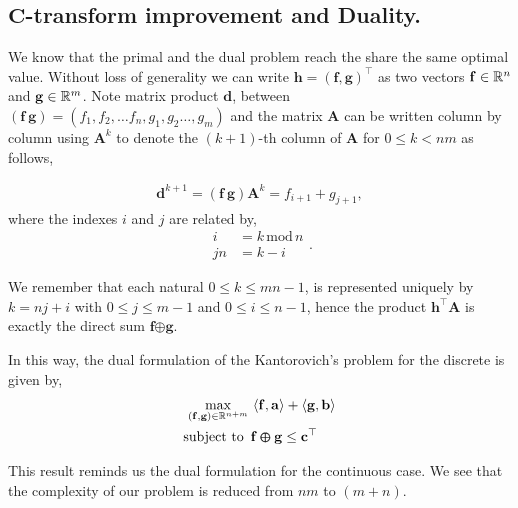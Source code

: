 \subsection{$\mathbf{C}$-transform improvement and Duality.}
We know that the primal and the dual problem reach the share the same optimal value. Without loss of generality we can write $\mathbf{h}=(\mathbf{f}, \mathbf{g})^\top$ as two vectors $\mathbf{f}\in \mathbb{R}^n$ and $\mathbf{g}\in \mathbb{R}^m$. Note matrix product $\mathbf{d}$, between
$(\mathbf{f} \ \mathbf{g})=(f_1, f_2, \dots f_n, g_1, g_2\dots, g_m)$ and the matrix $\mathbf{A}$ can be written column by column using $\mathbf{A}^k$ to denote the $(k+1)$-th column of $\mathbf{A}$ for $0\leq k < nm$ as follows, 

\begin{align}
\mathbf{d}^{k+1}=(\mathbf{f} \ \mathbf{g})\mathbf{A}^k=f_{i+1}+g_{j+1},
\end{align}
where the indexes $i$ and $j$ are related by,
\begin{equation}
\begin{array}{ll}
i&=k\,\text{mod}\,n \\ jn&=k-i
\end{array}.	
\end{equation}


We remember that each natural $0\leq k\leq mn-1$, is represented uniquely by $k=nj+i$ with $0\leq j\leq m-1$ and $0\leq i \leq n-1$,  hence the product $\mathbf{h}^\top\mathbf{A}$ is exactly the direct sum $\mathbf{f}\pmb{\oplus}\mathbf{g}$. 

In this way, the dual formulation of the Kantorovich's problem for the discrete is given by,
\begin{align}
\max_{\mathbf{(f,g)}\in \mathbb{R}^{n+m}}\, &\left\langle \mathbf{f}, \mathbf{a} \right\rangle+\left\langle \mathbf{g}, \mathbf{b} \right\rangle\\	
\text{subject to }\, &\mathbf{f}\pmb{\oplus}\mathbf{g}\leq \mathbf{c}^\top
\end{align}

This result reminds us the dual formulation for the continuous case. We see that the complexity of our problem is reduced from $nm$ to $(m+n)$.

